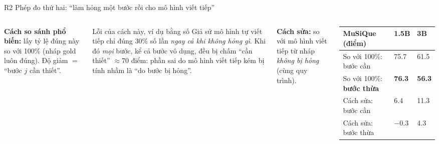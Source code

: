 \documentclass[aspectratio=169,t]{beamer}
\begin{document}
\begin{frame}[shrink]{R2 \textperiodcentered{} Phép đo thứ hai: ``làm hỏng một bước rồi cho mô hình viết tiếp''}
\centering
{}
\par\vspace{3pt}
\begin{columns}[T,onlytextwidth]
\footnotesize
\textbf{Cách so sánh phổ biến:} lấy tỷ lệ đúng này so với 100\% (nháp gold luôn đúng). Độ giảm $=$ ``bước $j$ cần thiết''.\par\vspace{3pt}
\begin{alertblock}{Lỗi của cách này, ví dụ bằng số}
\scriptsize
Giả sử mô hình tự viết tiếp chỉ đúng 30\% số lần \emph{ngay cả khi không hỏng gì}. Khi đó \emph{mọi} bước, kể cả bước vô dụng, đều bị chấm ``cần thiết'' $\approx 70$ điểm: phần sai do mô hình viết tiếp kém bị tính nhầm là ``do bước bị hỏng''.
\end{alertblock}
\scriptsize
\textbf{Cách sửa:} so với mô hình viết tiếp từ nháp \emph{không bị hỏng} (cùng quy trình).\par\vspace{3pt}
\renewcommand{\arraystretch}{1.15}
\begin{tabularx}{\linewidth}{@{}YQ{0.95cm}Q{0.95cm}@{}}
\toprule
\textbf{MuSiQue (điểm)} & \textbf{1.5B} & \textbf{3B}\\
\midrule
So với 100\%: bước cần & 75.7 & 61.5\\
So với 100\%: \textbf{bước thừa} & \textbf{76.3} & \textbf{56.3}\\
Cách sửa: bước cần & 6.4 & 11.3\\
Cách sửa: bước thừa & $-0.3$ & 4.3\\

\end{tabularx}
\end{columns}
\end{frame}
\end{document}
